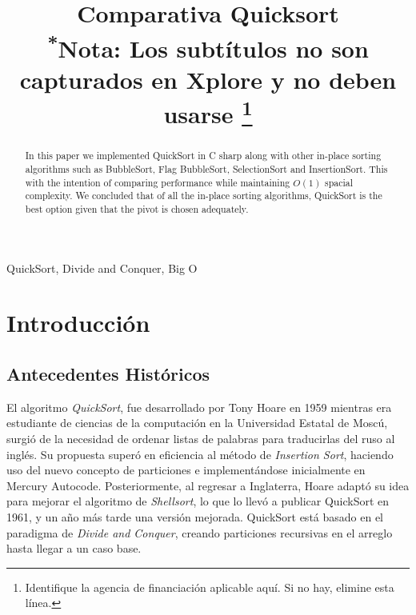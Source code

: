 \documentclass[conference]{IEEEtran}
\begin{document}
\title{Comparativa Quicksort\\
{\footnotesize \textsuperscript{*}Nota: Los subtítulos no son capturados en Xplore y
no deben usarse}%
\thanks{Identifique la agencia de financiación aplicable aquí. Si no hay, elimine esta línea.}}

\author{
\and
{}
}

\maketitle

\begin{abstract}
In this paper we implemented QuickSort in C sharp along with other in-place sorting algorithms such as BubbleSort, Flag BubbleSort, SelectionSort and InsertionSort.
This with the intention of comparing performance while maintaining $O(1)$ spacial complexity.
We concluded that of all the in-place sorting algorithms, QuickSort is the best option given that the pivot is chosen adequately.
\end{abstract}

\begin{IEEEkeywords}
QuickSort, Divide and Conquer, Big O
\end{IEEEkeywords}


\section{Introducción}

\subsection{Antecedentes Históricos}
El algoritmo \textit{QuickSort}, fue desarrollado por Tony Hoare en 1959 mientras era estudiante de ciencias de la computación en la Universidad Estatal de Moscú, 
surgió de la necesidad de ordenar listas de palabras para traducirlas del ruso al inglés. 
Su propuesta superó en eficiencia al método de \textit{Insertion Sort}, haciendo uso del nuevo concepto de particiones e implementándose inicialmente en Mercury Autocode. 
Posteriormente, al regresar a Inglaterra, Hoare adaptó su idea para mejorar el algoritmo de \textit{Shellsort}, lo que lo llevó a publicar QuickSort en 1961, y un año más tarde una versión mejorada. QuickSort está basado en el paradigma de \textit{Divide and Conquer}, creando particiones recursivas en el arreglo hasta llegar a un caso base. \cite{history} 
\end{document}
